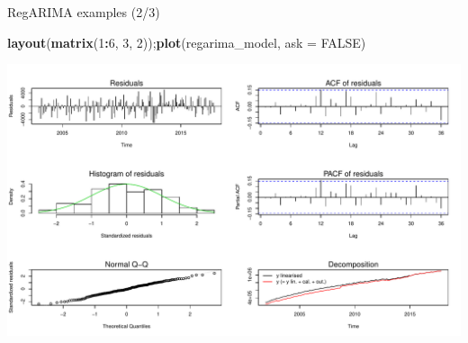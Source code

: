 \documentclass[10pt,xcolor=table,color={dvipsnames,usenames},ignorenonframetext,usepdftitle=false,french]{beamer}
\newenvironment{Shaded}{\begin{snugshade}}{\end{snugshade}}
\newcommand{\KeywordTok}[1]{\textcolor[rgb]{0.13,0.29,0.53}{\textbf{#1}}}
\newcommand{\DataTypeTok}[1]{\textcolor[rgb]{0.13,0.29,0.53}{#1}}
\newcommand{\DecValTok}[1]{\textcolor[rgb]{0.00,0.00,0.81}{#1}}
\newcommand{\OtherTok}[1]{\textcolor[rgb]{0.56,0.35,0.01}{#1}}
\newcommand{\OperatorTok}[1]{\textcolor[rgb]{0.81,0.36,0.00}{\textbf{#1}}}
\newcommand{\NormalTok}[1]{#1}
\begin{document}
\begin{frame}[fragile]{RegARIMA examples (2/3)}

\begin{Shaded}
\begin{Highlighting}[]
\KeywordTok{layout}\NormalTok{(}\KeywordTok{matrix}\NormalTok{(}\DecValTok{1}\OperatorTok{:}\DecValTok{6}\NormalTok{, }\DecValTok{3}\NormalTok{, }\DecValTok{2}\NormalTok{));}\KeywordTok{plot}\NormalTok{(regarima_model, }\DataTypeTok{ask =} \OtherTok{FALSE}\NormalTok{)}
\end{Highlighting}
\end{Shaded}

\includegraphics{rjdemetra_files/figure-beamer/unnamed-chunk-3-1.pdf}

\end{frame}
\end{document}
